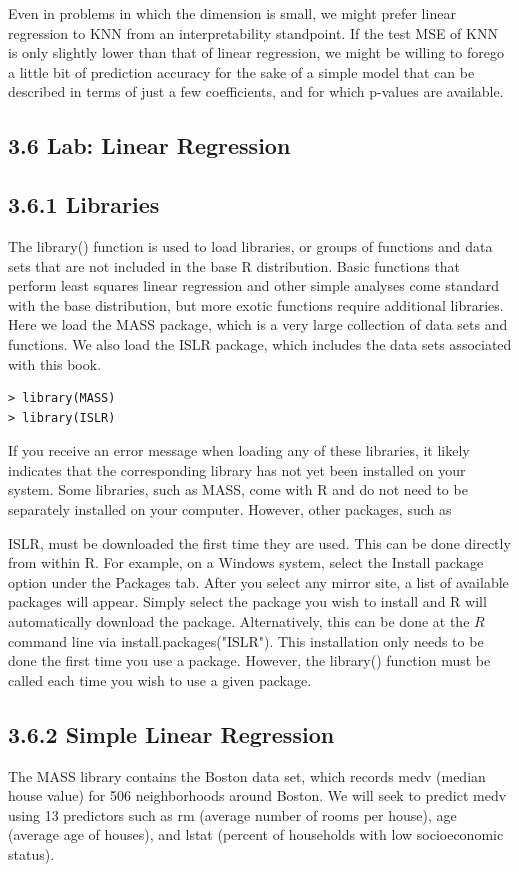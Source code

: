 \documentclass[10pt]{article}
\begin{document}
Even in problems in which the dimension is small, we might prefer linear regression to KNN from an interpretability standpoint. If the test MSE of KNN is only slightly lower than that of linear regression, we might be willing to forego a little bit of prediction accuracy for the sake of a simple model that can be described in terms of just a few coefficients, and for which p-values are available.

\subsection*{3.6 Lab: Linear Regression}
\subsection*{3.6.1 Libraries}
The library() function is used to load libraries, or groups of functions and data sets that are not included in the base R distribution. Basic functions that perform least squares linear regression and other simple analyses come standard with the base distribution, but more exotic functions require additional libraries. Here we load the MASS package, which is a very large collection of data sets and functions. We also load the ISLR package, which includes the data sets associated with this book.

\begin{verbatim}
> library(MASS)
> library(ISLR)
\end{verbatim}

If you receive an error message when loading any of these libraries, it likely indicates that the corresponding library has not yet been installed on your system. Some libraries, such as MASS, come with R and do not need to be separately installed on your computer. However, other packages, such as

ISLR, must be downloaded the first time they are used. This can be done directly from within R. For example, on a Windows system, select the Install package option under the Packages tab. After you select any mirror site, a list of available packages will appear. Simply select the package you wish to install and R will automatically download the package. Alternatively, this can be done at the $R$ command line via install.packages("ISLR"). This installation only needs to be done the first time you use a package. However, the library() function must be called each time you wish to use a given package.

\subsection*{3.6.2 Simple Linear Regression}
The MASS library contains the Boston data set, which records medv (median house value) for 506 neighborhoods around Boston. We will seek to predict medv using 13 predictors such as rm (average number of rooms per house), age (average age of houses), and lstat (percent of households with low socioeconomic status).
\end{document}
